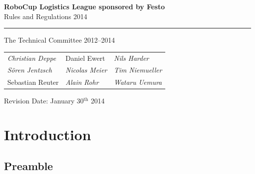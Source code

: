 \documentclass[12pt,twoside]{article}
\begin{document}
\hypersetup{pageanchor=false}


\begin{titlepage}
  \vspace*{5cm}
  \begin{center}
    \begin{LARGE}
      
      {\bf RoboCup Logistics League sponsored by Festo}\\[2ex]
      {\Large Rules and Regulations 2014}\\[4ex]
    \end{LARGE}
    \hrule
    
    {\LARGE\vspace*{4ex}}
    \begin{Large}
      The Technical Committee 2012--2014\\[6ex]
    \end{Large}
    \begin{tabular}{lll}
    \emph{Christian Deppe}&Daniel Ewert&\emph{Nils Harder}\\
    \emph{S\"oren Jentzsch}&\emph{Nicolas Meier}&\emph{Tim Niemueller}\\
      Sebastian Reuter&\emph{Alain Rohr}&\emph{Wataru Uemura}\\
    \end{tabular}
    \vfill
    Revision Date: January 30$^\mathrm{th}$ 2014
  \end{center}
\end{titlepage}
\thispagestyle{empty}
\pagebreak
\clearpage

\hypersetup{pageanchor=true}
\setcounter{page}{1}
\tableofcontents
\newpage
\cleardoublepage

\setcounter{page}{1}

\section{Introduction} \label{sec:intro}

\subsection*{Preamble} \label{sec:preamble}
\end{document}
